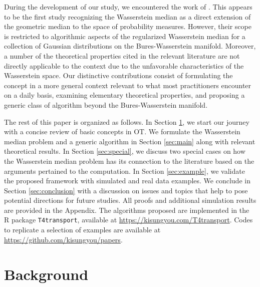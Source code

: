 \documentclass[11pt]{article}
\begin{document}
During the development of our study, we encountered the work of \cite{altschuler_2021_AveragingBuresWassersteinManifold}. This appears to be the first study recognizing the Wasserstein median as a direct extension of the geometric median to the space of probability measures. However, their scope is restricted to algorithmic aspects of the regularized Wasserstein median for a collection of Gaussian distributions on the Bures-Wasserstein manifold. Moreover, a number of the theoretical properties cited in the relevant literature are not directly applicable to the context due to the unfavorable characteristics of the Wasserstein space. Our distinctive contributions consist of formulating the concept in a more general context relevant to what most practitioners encounter on a daily basis, examining elementary theoretical properties, and proposing a generic class of algorithm beyond the Bures-Wasserstein manifold. 




The rest of this paper is organized as follows. In Section \ref{sec:geometry}, we start our journey with a concise review of basic concepts in OT. We formulate the Wasserstein median problem and a generic algorithm in Section \ref{sec:main} along with relevant  theoretical results. In Section \ref{sec:special}, we discuss two special cases on how the Wasserstein median problem has its connection to the literature based on the arguments pertained to the computation. In Section \ref{sec:example}, we validate the proposed framework with simulated and real data examples. We conclude in Section \ref{sec:conclusion} with a discussion on issues and topics that help to pose potential directions for future studies.  All proofs and additional simulation results are provided in the Appendix. The algorithms proposed are implemented in the \textsf{R} package \texttt{T4transport}, available at \url{https://kisungyou.com/T4transport}. Codes to replicate a selection of examples are available at \url{https://github.com/kisungyou/papers}.



\section{Background}\label{sec:geometry}
\end{document}
